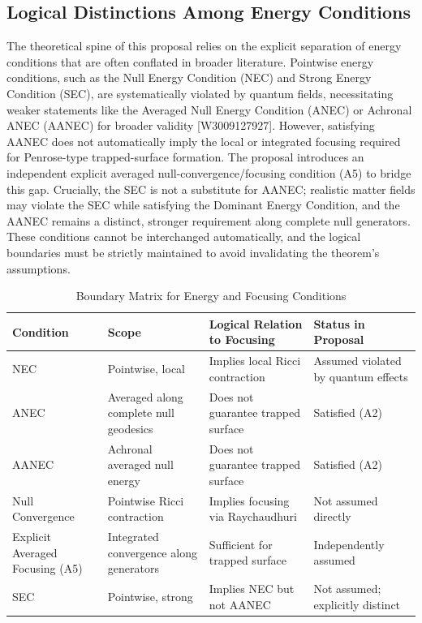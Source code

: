 \documentclass[conference]{IEEEtran}
\begin{document}
\subsection{Logical Distinctions Among Energy Conditions}
The theoretical spine of this proposal relies on the explicit separation of energy conditions that are often conflated in broader literature. Pointwise energy conditions, such as the Null Energy Condition (NEC) and Strong Energy Condition (SEC), are systematically violated by quantum fields, necessitating weaker statements like the Averaged Null Energy Condition (ANEC) or Achronal ANEC (AANEC) for broader validity [W3009127927]. However, satisfying AANEC does not automatically imply the local or integrated focusing required for Penrose-type trapped-surface formation. The proposal introduces an independent explicit averaged null-convergence/focusing condition (A5) to bridge this gap. Crucially, the SEC is not a substitute for AANEC; realistic matter fields may violate the SEC while satisfying the Dominant Energy Condition, and the AANEC remains a distinct, stronger requirement along complete null generators. These conditions cannot be interchanged automatically, and the logical boundaries must be strictly maintained to avoid invalidating the theorem's assumptions.~\cite{cite_0ed84243cf171bc4}

\begin{table}[htbp]
\centering
\footnotesize
\setlength{\tabcolsep}{3pt}
\renewcommand{\arraystretch}{1.12}
\caption{Boundary Matrix for Energy and Focusing Conditions}
\label{tab:appendix-variables-and-definitions-b2}
\begin{tabular}{|p{}|p{}|p{}|p{}|}
\hline
Condition & Scope & Logical Relation to Focusing & Status in Proposal \\\hline
NEC & Pointwise, local & Implies local Ricci contraction & Assumed violated by quantum effects \\\hline
ANEC & Averaged along complete null geodesics & Does not guarantee trapped surface & Satisfied (A2) \\\hline
AANEC & Achronal averaged null energy & Does not guarantee trapped surface & Satisfied (A2) \\\hline
Null Convergence & Pointwise Ricci contraction & Implies focusing via Raychaudhuri & Not assumed directly \\\hline
Explicit Averaged Focusing (A5) & Integrated convergence along generators & Sufficient for trapped surface & Independently assumed \\\hline
SEC & Pointwise, strong & Implies NEC but not AANEC & Not assumed; explicitly distinct \\\hline
\end{tabular}
\end{table}~\cite{cite_0ed84243cf171bc4}
\end{document}
